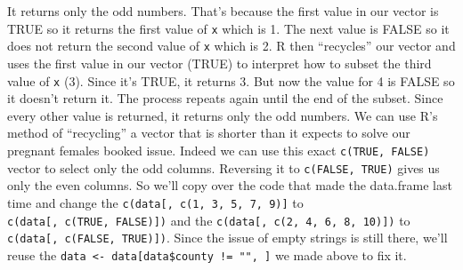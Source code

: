 \documentclass[
  12pt,
]{book}
\newenvironment{Shaded}{\begin{snugshade}}{\end{snugshade}}
\newcommand{\CommentTok}[1]{\textcolor[rgb]{0.56,0.35,0.01}{\textit{#1}}}
\newcommand{\DataTypeTok}[1]{\textcolor[rgb]{0.13,0.29,0.53}{#1}}
\newcommand{\KeywordTok}[1]{\textcolor[rgb]{0.13,0.29,0.53}{\textbf{#1}}}
\newcommand{\NormalTok}[1]{#1}
\newcommand{\OperatorTok}[1]{\textcolor[rgb]{0.81,0.36,0.00}{\textbf{#1}}}
\newcommand{\OtherTok}[1]{\textcolor[rgb]{0.56,0.35,0.01}{#1}}
\newcommand{\StringTok}[1]{\textcolor[rgb]{0.31,0.60,0.02}{#1}}
\begin{document}
It returns only the odd numbers. That's because the first value in our vector is TRUE so it returns the first value of \texttt{x} which is 1. The next value is FALSE so it does not return the second value of \texttt{x} which is 2. R then ``recycles'' our vector and uses the first value in our vector (TRUE) to interpret how to subset the third value of \texttt{x} (3). Since it's TRUE, it returns 3. But now the value for 4 is FALSE so it doesn't return it. The process repeats again until the end of the subset. Since every other value is returned, it returns only the odd numbers. We can use R's method of ``recycling'' a vector that is shorter than it expects to solve our pregnant females booked issue. Indeed we can use this exact \texttt{c(TRUE,\ FALSE)} vector to select only the odd columns. Reversing it to \texttt{c(FALSE,\ TRUE)} gives us only the even columns. So we'll copy over the code that made the data.frame last time and change the \texttt{c(data{[},\ c(1,\ 3,\ 5,\ 7,\ 9){]}} to \texttt{c(data{[},\ c(TRUE,\ FALSE){]})} and the \texttt{c(data{[},\ c(2,\ 4,\ 6,\ 8,\ 10){]})} to \texttt{c(data{[},\ c(FALSE,\ TRUE){]})}. Since the issue of empty strings is still there, we'll reuse the \texttt{data\ \textless{}-\ data{[}data\$county\ !=\ "",\ {]}} we made above to fix it.

\begin{Shaded}
\end{Shaded}
\end{document}
